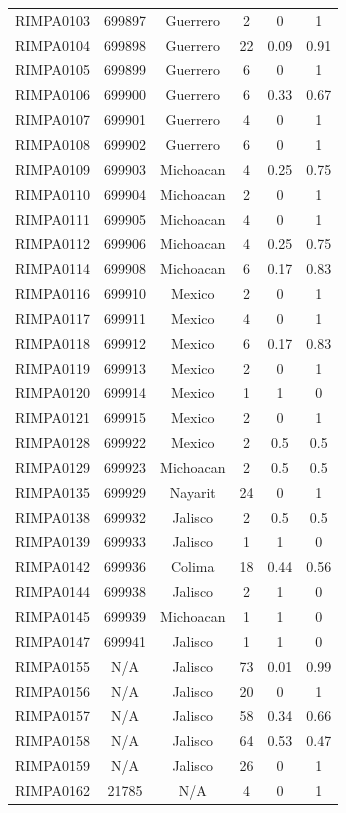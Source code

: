 \documentclass[11pt]{article}
\newcounter{rowno}
\begin{document}
\begin{scriptsize}
\begin{longtable}{>{\stepcounter{rowno}}cccccc}
    RIMPA0103 & 699897 & Guerrero & 2     & 0     & 1 \\
    RIMPA0104 & 699898 & Guerrero & 22    & 0.09 & 0.91 \\
    RIMPA0105 & 699899 & Guerrero & 6     & 0     & 1 \\
    RIMPA0106 & 699900 & Guerrero & 6     & 0.33 & 0.67 \\
    RIMPA0107 & 699901 & Guerrero & 4     & 0     & 1 \\
    RIMPA0108 & 699902 & Guerrero & 6     & 0     & 1 \\
    RIMPA0109 & 699903 & Michoacan & 4     & 0.25  & 0.75 \\
    RIMPA0110 & 699904 & Michoacan & 2     & 0     & 1 \\
    RIMPA0111 & 699905 & Michoacan & 4     & 0     & 1 \\
    RIMPA0112 & 699906 & Michoacan & 4     & 0.25  & 0.75 \\
    RIMPA0114 & 699908 & Michoacan & 6     & 0.17 & 0.83 \\
    RIMPA0116 & 699910 & Mexico & 2     & 0     & 1 \\
    RIMPA0117 & 699911 & Mexico & 4     & 0     & 1 \\
    RIMPA0118 & 699912 & Mexico & 6     & 0.17 & 0.83 \\
    RIMPA0119 & 699913 & Mexico & 2     & 0     & 1 \\
    RIMPA0120 & 699914 & Mexico & 1     & 1     & 0 \\
    RIMPA0121 & 699915 & Mexico & 2     & 0     & 1 \\
    RIMPA0128 & 699922 & Mexico & 2     & 0.5   & 0.5 \\
    RIMPA0129 & 699923 & Michoacan & 2     & 0.5   & 0.5 \\
    RIMPA0135 & 699929 & Nayarit & 24    & 0     & 1 \\
    RIMPA0138 & 699932 & Jalisco & 2     & 0.5   & 0.5 \\
    RIMPA0139 & 699933 & Jalisco & 1     & 1     & 0 \\
    RIMPA0142 & 699936 & Colima & 18    & 0.44 & 0.56 \\
    RIMPA0144 & 699938 & Jalisco & 2     & 1     & 0 \\
    RIMPA0145 & 699939 & Michoacan & 1     & 1     & 0 \\
    RIMPA0147 & 699941 & Jalisco & 1     & 1     & 0 \\
    RIMPA0155 & N/A   & Jalisco & 73    & 0.01 & 0.99 \\
    RIMPA0156 & N/A   & Jalisco & 20    & 0     & 1 \\
    RIMPA0157 & N/A   & Jalisco & 58    & 0.34 & 0.66 \\
    RIMPA0158 & N/A   & Jalisco & 64    & 0.53 & 0.47 \\
    RIMPA0159 & N/A   & Jalisco & 26    & 0     & 1 \\
    RIMPA0162 & 21785 & N/A   & 4     & 0     & 1 \\
    \hline
\end{longtable}
\end{scriptsize}
\clearpage
\end{document}
